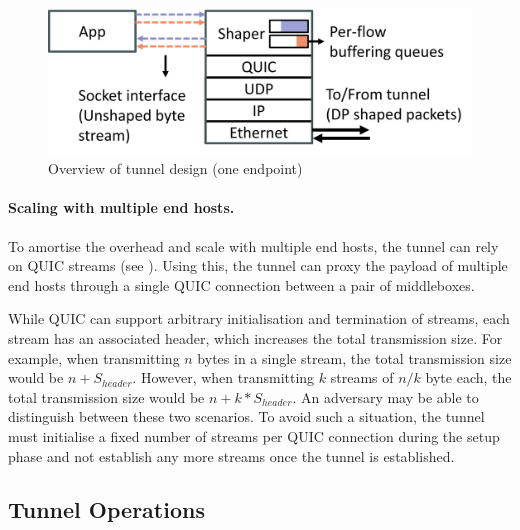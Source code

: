 \begin{figure}[!htb]
    \centering
    \includegraphics[width=\columnwidth]{figures/netshaper/tunnel-endpoint-design.png}
    \caption{Overview of tunnel design (one endpoint)}
    \label{fig:tunnel-endpoint-design}
\end{figure}

\paragraph{Scaling with multiple end hosts.}
To amortise the overhead and scale with multiple end hosts, the tunnel can rely on QUIC streams (see ).
Using this, the tunnel can proxy the payload of multiple end hosts through a single QUIC connection between a pair of middleboxes.

While QUIC can support arbitrary initialisation and termination of streams, each stream has an associated header, which increases the total transmission size.
For example, when transmitting $n$ bytes in a single stream, the total transmission size would be $n + S_{header}$.
However, when transmitting $k$ streams of $n/k$ byte each, the total transmission size would be $n + k*S_{header}$. 
An adversary may be able to distinguish between these two scenarios.
To avoid such a situation, the tunnel must initialise a fixed number of streams per QUIC connection during the setup phase and not establish any more streams once the tunnel is established.


\subsection{Tunnel Operations}


